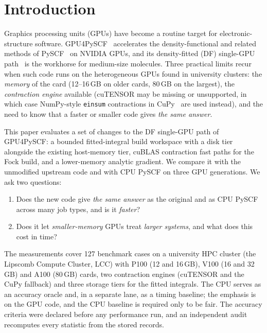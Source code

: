 \section{Introduction}

Graphics processing units (GPUs) have become a routine target for electronic-structure software. GPU4PySCF~\cite{li2024gpu4pyscf,wu2024gpu4pyscf} accelerates the density-functional and related methods of PySCF~\cite{sun2018pyscf,sun2020pyscf} on NVIDIA GPUs, and its density-fitted (DF) single-GPU path~\cite{whitten1973,dunlap1979,vahtras1993} is the workhorse for medium-size molecules. Three practical limits recur when such code runs on the heterogeneous GPUs found in university clusters: the \emph{memory} of the card (12--16\,GB on older cards, 80\,GB on the largest), the \emph{contraction engine} available (cuTENSOR may be missing or unsupported, in which case NumPy-style \texttt{einsum} contractions in CuPy~\cite{okuta2017cupy} are used instead), and the need to know that a faster or smaller code gives \emph{the same answer}.

This paper evaluates a set of changes to the DF single-GPU path of GPU4PySCF: a bounded fitted-integral build workspace with a disk tier alongside the existing host-memory tier, cuBLAS contraction fast paths for the Fock build, and a lower-memory analytic gradient. We compare it with the unmodified upstream code and with CPU PySCF on three GPU generations. We ask two questions:

\begin{enumerate}[itemsep=1pt]
\item Does the new code give \emph{the same answer} as the original and as CPU PySCF across many job types, and is it \emph{faster}?
\item Does it let \emph{smaller-memory} GPUs treat \emph{larger systems}, and what does this cost in time?
\end{enumerate}

The measurements cover 127 benchmark cases on a university HPC cluster (the Lipscomb Compute Cluster, LCC) with P100 (12 and 16\,GB), V100 (16 and 32\,GB) and A100 (80\,GB) cards, two contraction engines (cuTENSOR and the CuPy fallback) and three storage tiers for the fitted integrals. The CPU serves as an accuracy oracle and, in a separate lane, as a timing baseline; the emphasis is on the GPU code, and the CPU baseline is required only to be fair. The accuracy criteria were declared before any performance run, and an independent audit recomputes every statistic from the stored records.

